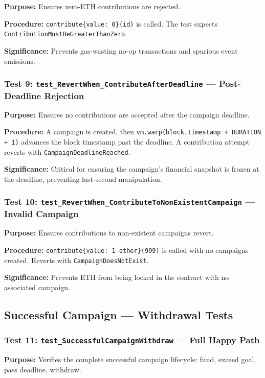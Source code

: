\textbf{Purpose:} Ensures zero-ETH contributions are rejected.

\textbf{Procedure:} \texttt{contribute\{value: 0\}(id)} is called. The test expects \texttt{ContributionMustBeGreaterThanZero}.

\textbf{Significance:} Prevents gas-wasting no-op transactions and spurious event emissions.

\subsubsection{Test 9: \texttt{test\_RevertWhen\_ContributeAfterDeadline} --- Post-Deadline Rejection}

\textbf{Purpose:} Ensures no contributions are accepted after the campaign deadline.

\textbf{Procedure:} A campaign is created, then \texttt{vm.warp(block.timestamp + DURATION + 1)} advances the block timestamp past the deadline. A contribution attempt reverts with \texttt{CampaignDeadlineReached}.

\textbf{Significance:} Critical for ensuring the campaign's financial snapshot is frozen at the deadline, preventing last-second manipulation.

\subsubsection{Test 10: \texttt{test\_RevertWhen\_ContributeToNonExistentCampaign} --- Invalid Campaign}

\textbf{Purpose:} Ensures contributions to non-existent campaigns revert.

\textbf{Procedure:} \texttt{contribute\{value: 1 ether\}(999)} is called with no campaigns created. Reverts with \texttt{CampaignDoesNotExist}.

\textbf{Significance:} Prevents ETH from being locked in the contract with no associated campaign.

\subsection{Successful Campaign --- Withdrawal Tests}

\subsubsection{Test 11: \texttt{test\_SuccessfulCampaignWithdraw} --- Full Happy Path}

\textbf{Purpose:} Verifies the complete successful campaign lifecycle: fund, exceed goal, pass deadline, withdraw.

